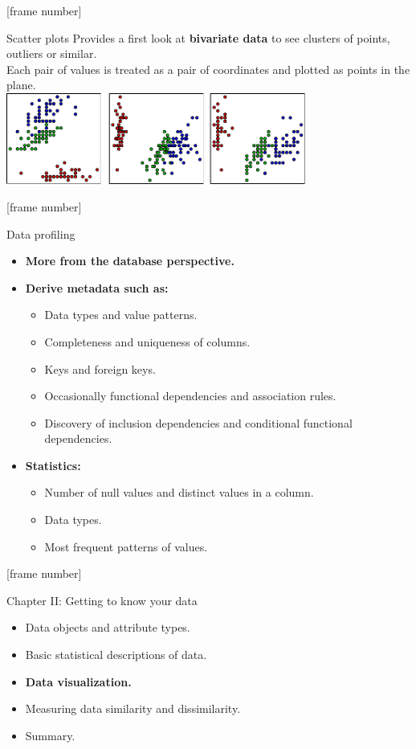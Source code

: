 \documentclass[aspectratio=169,t]{beamer}
\begin{document}
  {
    [frame number]
    \begin{frame}{Scatter plots}
    Provides a first look at \textbf{bivariate data} to see clusters of points, outliers or similar.\\
    Each pair of values is treated as a pair of coordinates and plotted as points in the plane.\\[0.5cm]
    \centering
    \includegraphics[height=3cm]{img/scatterplot.pdf}
    \end{frame}
  }

  {
    [frame number]
    \begin{frame}{Data profiling}
    \begin{itemize}
      \item \textbf{More from the database perspective.}
      \item \textbf{Derive metadata such as:}
      \begin{itemize}
        \item Data types and value patterns.
        \item Completeness and uniqueness of columns.
        \item Keys and foreign keys.
        \item Occasionally functional dependencies and association rules.
        \item Discovery of inclusion dependencies and conditional functional dependencies.
      \end{itemize}
      \item \textbf{Statistics:}
      \begin{itemize}
        \item Number of null values and distinct values in a column.
        \item Data types.
        \item Most frequent patterns of values.
      \end{itemize}
    \end{itemize}
    \end{frame}
  }

  {
    [frame number]
    \begin{frame}{Chapter II: Getting to know your data}
    \begin{itemize}
      \item Data objects and attribute types.
      \item Basic statistical descriptions of data.
      \item \textbf{Data visualization.}
      \item Measuring data similarity and dissimilarity.
      \item Summary.
    \end{itemize}
    \end{frame}
  }
\end{document}
